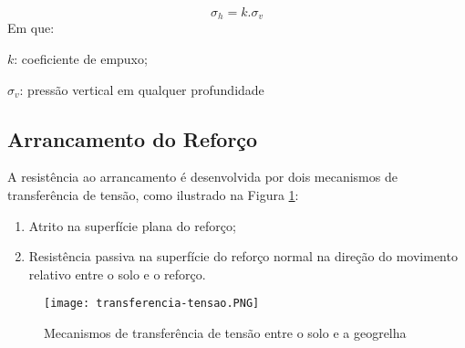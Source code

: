  \begin{equation}
     \sigma_h = k . \sigma_v
 \end{equation}
 Em que: 
 
 $k$: coeficiente de empuxo;
 
 $\sigma_v$: pressão vertical em qualquer profundidade
 
 
 
 \subsection{Arrancamento do Reforço}
 
A resistência ao arrancamento é desenvolvida por dois mecanismos de transferência de tensão, como ilustrado na Figura \ref{fig:transferencia-tensao}: 

\begin{enumerate}
    \item Atrito na superfície plana do reforço;
    \item Resistência passiva na superfície do reforço normal na direção do movimento relativo entre o solo e o reforço.
\end{enumerate}

\begin{figure}[htb]
 \caption{Mecanismos de transferência de tensão entre o solo e a geogrelha}
 \label{fig:transferencia-tensao}
 \centering
 \texttt{[image: transferencia-tensao.PNG]}
\end{figure}
 
 
 


